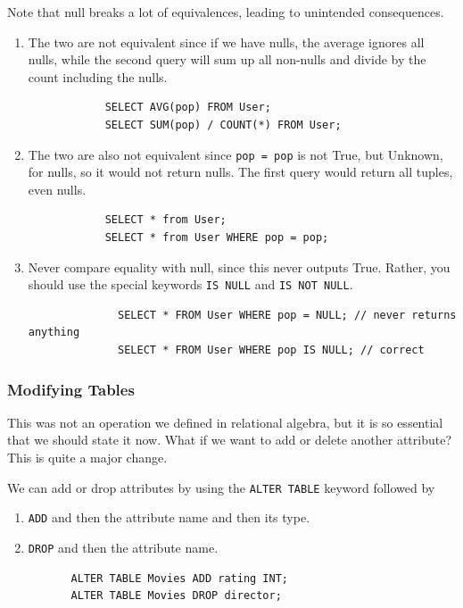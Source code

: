 \documentclass{article}
\begin{document}
      \begin{example}[Warnings]
        Note that null breaks a lot of equivalences, leading to unintended consequences. 
        \begin{enumerate}
          \item The two are not equivalent since if we have nulls, the average ignores all nulls, while the second query will sum up all non-nulls and divide by the count including the nulls. 
          \begin{lstlisting}
            SELECT AVG(pop) FROM User; 
            SELECT SUM(pop) / COUNT(*) FROM User; 
          \end{lstlisting}

          \item The two are also not equivalent since \texttt{pop = pop} is not True, but Unknown, for nulls, so it would not return nulls. The first query would return all tuples, even nulls. 
          \begin{lstlisting}
            SELECT * from User; 
            SELECT * from User WHERE pop = pop; 
          \end{lstlisting}

          \item Never compare equality with null, since this never outputs True. Rather, you should use the special keywords \texttt{IS NULL} and \texttt{IS NOT NULL}. 
            \begin{lstlisting}
              SELECT * FROM User WHERE pop = NULL; // never returns anything 
              SELECT * FROM User WHERE pop IS NULL; // correct 
            \end{lstlisting}
        \end{enumerate}
      \end{example}

    \subsubsection{Modifying Tables}

      This was not an operation we defined in relational algebra, but it is so essential that we should state it now. What if we want to add or delete another attribute? This is quite a major change. 

      \begin{theorem}
        We can add or drop attributes by using the \texttt{ALTER TABLE} keyword followed by 
        \begin{enumerate}
          \item \texttt{ADD} and then the attribute name and then its type. 
          \item \texttt{DROP} and then the attribute name. 
        \end{enumerate}
        \begin{lstlisting}
          ALTER TABLE Movies ADD rating INT; 
          ALTER TABLE Movies DROP director; 
        \end{lstlisting}
      \end{theorem} 
\end{document}
